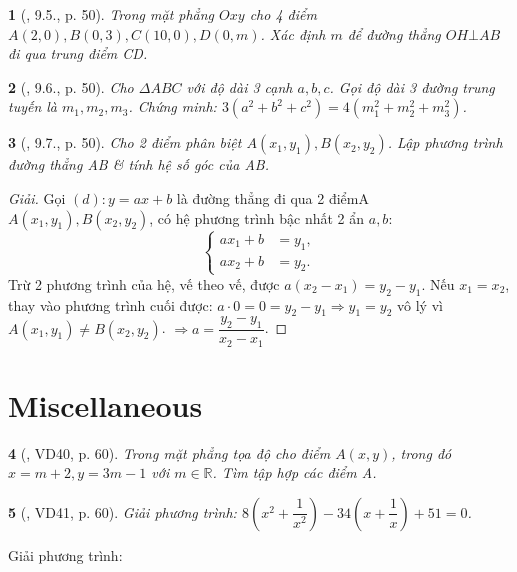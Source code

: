\documentclass{article}
\newtheorem{baitoan}{}
\begin{document}
\begin{baitoan}[\cite{TLCT_THCS_Toan_9_dai_so}, 9.5., p. 50]
	Trong mặt phẳng $Oxy$ cho 4 điểm $A(2,0),B(0,3),C(10,0),D(0,m)$. Xác định $m$ để đường thẳng $OH\bot AB$ đi qua trung điểm CD.
\end{baitoan}

\begin{baitoan}[\cite{TLCT_THCS_Toan_9_dai_so}, 9.6., p. 50]
	Cho $\Delta ABC$ với độ dài 3 cạnh $a,b,c$. Gọi độ dài 3 đường trung tuyến là $m_1,m_2,m_3$. Chứng minh: $3(a^2 + b^2 + c^2) = 4(m_1^2 + m_2^2 + m_3^2)$.
\end{baitoan}

\begin{baitoan}[\cite{TLCT_THCS_Toan_9_dai_so}, 9.7., p. 50]
	Cho 2 điểm phân biệt $A(x_1,y_1),B(x_2,y_2)$. Lập phương trình đường thẳng AB \& tính hệ số góc của AB.
\end{baitoan}

\begin{proof}[Giải]
	Gọi $(d):y = ax + b$ là đường thẳng đi qua 2 điểmA $A(x_1,y_1),B(x_2,y_2)$, có hệ phương trình bậc nhất 2 ẩn $a,b$:
	\begin{equation*}
		\left\{\begin{split}
			ax_1 + b &= y_1,\\
			ax_2 + b &= y_2.
		\end{split}\right.
	\end{equation*}
	Trừ 2 phương trình của hệ, vế theo vế, được $a(x_2 - x_1) = y_2 - y_1$. Nếu $x_1 = x_2$, thay vào phương trình cuối được: $a\cdot 0 = 0 = y_2 - y_1\Rightarrow y_1 = y_2$ vô lý vì$A(x_1,y_1)\ne B(x_2,y_2)$. $\Rightarrow a = \dfrac{y_2 - y_1}{x_2 - x_1}$.
\end{proof}


\section{Miscellaneous}

\begin{baitoan}[\cite{Tuyen_Toan_8}, VD40, p. 60]
	Trong mặt phẳng tọa độ cho điểm $A(x,y)$, trong đó $x = m + 2,y = 3m - 1$ với $m\in\mathbb{R}$. Tìm tập hợp các điểm A.
\end{baitoan}

\begin{baitoan}[\cite{Tuyen_Toan_8}, VD41, p. 60]
	Giải phương trình: $8\left(x^2 + \dfrac{1}{x^2}\right) - 34\left(x + \dfrac{1}{x}\right) + 51 = 0$.
\end{baitoan}
Giải phương trình:
\end{document}
